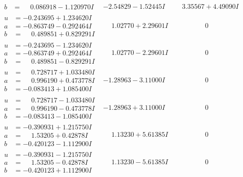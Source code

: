 \documentclass[1p]{elsarticle_modified}
\theoremstyle{definition}
\begin{document}
$$\begin{array}{c|c|c}
\begin{aligned}
b &= \phantom{-}0.086918 - 1.120970 I\end{aligned}
 & -2.54829 - 1.52445 I & \phantom{-}3.35567 + 4.49090 I \\ \hline\begin{aligned}
u &= -0.243695 + 1.234620 I \\
a &= -0.863749 - 0.292464 I \\
b &= \phantom{-}0.489851 + 0.829291 I\end{aligned}
 & \phantom{-}1.02770 + 2.29601 I & \phantom{-0.000000 } 0 \\ \hline\begin{aligned}
u &= -0.243695 - 1.234620 I \\
a &= -0.863749 + 0.292464 I \\
b &= \phantom{-}0.489851 - 0.829291 I\end{aligned}
 & \phantom{-}1.02770 - 2.29601 I & \phantom{-0.000000 } 0 \\ \hline\begin{aligned}
u &= \phantom{-}0.728717 + 1.033480 I \\
a &= \phantom{-}0.996190 + 0.473778 I \\
b &= -0.083413 + 1.085400 I\end{aligned}
 & -1.28963 - 3.11000 I & \phantom{-0.000000 } 0 \\ \hline\begin{aligned}
u &= \phantom{-}0.728717 - 1.033480 I \\
a &= \phantom{-}0.996190 - 0.473778 I \\
b &= -0.083413 - 1.085400 I\end{aligned}
 & -1.28963 + 3.11000 I & \phantom{-0.000000 } 0 \\ \hline\begin{aligned}
u &= -0.390931 + 1.215750 I \\
a &= \phantom{-}1.53205 + 0.42878 I \\
b &= -0.420123 - 1.112900 I\end{aligned}
 & \phantom{-}1.13230 + 5.61385 I & \phantom{-0.000000 } 0 \\ \hline\begin{aligned}
u &= -0.390931 - 1.215750 I \\
a &= \phantom{-}1.53205 - 0.42878 I \\
b &= -0.420123 + 1.112900 I\end{aligned}
 & \phantom{-}1.13230 - 5.61385 I & \phantom{-0.000000 } 0 \\ \hline\begin{aligned}

\end{aligned}
\end{array}$$
\end{document}
